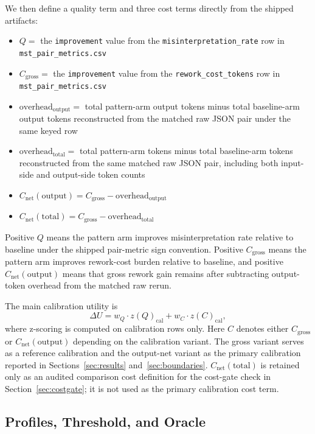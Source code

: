\documentclass[11pt,a4paper]{article}
\begin{document}
We then define a quality term and three cost terms directly from the shipped
artifacts:
\begin{itemize}
  \item $Q =$ the \texttt{improvement} value from the
  \texttt{misinterpretation\_rate} row in \texttt{mst\_pair\_metrics.csv}
  \item $C_{\mathrm{gross}} =$ the \texttt{improvement} value from the
  \texttt{rework\_cost\_tokens} row in \texttt{mst\_pair\_metrics.csv}
  \item $\mathrm{overhead}_{\mathrm{output}} =$ total pattern-arm output tokens
  minus total baseline-arm output tokens reconstructed from the matched raw JSON
  pair under the same keyed row
  \item $\mathrm{overhead}_{\mathrm{total}} =$ total pattern-arm tokens minus
  total baseline-arm tokens reconstructed from the same matched raw JSON pair,
  including both input-side and output-side token counts
  \item $C_{\mathrm{net}}(\mathrm{output}) = C_{\mathrm{gross}} - \mathrm{overhead}_{\mathrm{output}}$
  \item $C_{\mathrm{net}}(\mathrm{total}) = C_{\mathrm{gross}} - \mathrm{overhead}_{\mathrm{total}}$
\end{itemize}

Positive $Q$ means the pattern arm improves misinterpretation rate relative to
baseline under the shipped pair-metric sign convention. Positive
$C_{\mathrm{gross}}$ means the pattern arm improves rework-cost burden relative to
baseline, and positive \(C_{\mathrm{net}}(\mathrm{output})\) means that gross
rework gain remains after subtracting output-token overhead from the matched raw
rerun.

The main calibration utility is
\[
\Delta U = w_Q \cdot z(Q)_{\mathrm{cal}} + w_C \cdot z(C)_{\mathrm{cal}},
\]
where z-scoring is computed on calibration rows only.
Here $C$ denotes either $C_{\mathrm{gross}}$ or $C_{\mathrm{net}}(\mathrm{output})$ depending on the calibration variant.
The gross variant serves as a reference calibration and the output-net variant as
the primary calibration reported in Sections~\ref{sec:results}
and~\ref{sec:boundaries}. $C_{\mathrm{net}}(\mathrm{total})$ is retained only as
an audited comparison cost definition for the cost-gate check in
Section~\ref{sec:costgate}; it is not used as the primary calibration cost term.

\subsection{Profiles, Threshold, and Oracle}
\label{sec:profiles}
\end{document}
